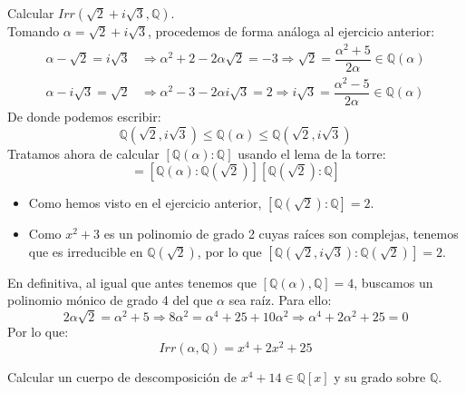 \begin{ejercicio}
    Calcular $Irr(\sqrt{2}+i\sqrt{3},\mathbb{Q})$.\\

    \noindent
    Tomando $\alpha = \sqrt{2}+i\sqrt{3}$, procedemos de forma análoga al ejercicio anterior:
    \begin{align*}
        \alpha-\sqrt{2} = i\sqrt{3} &\Longrightarrow \alpha^2 + 2 - 2\alpha\sqrt{2} = -3 \Longrightarrow \sqrt{2} = \dfrac{\alpha^2+5}{2\alpha} \in \mathbb{Q}(\alpha)\\
        \alpha-i\sqrt{3} = \sqrt{2} &\Longrightarrow \alpha^2 -3 -2\alpha i \sqrt{3} = 2 \Longrightarrow i\sqrt{3} = \dfrac{\alpha^2-5}{2\alpha} \in \mathbb{Q}(\alpha)
    \end{align*}
    De donde podemos escribir:
    \begin{equation*}
        \mathbb{Q}(\sqrt{2},i\sqrt{3}) \leq \mathbb{Q}(\alpha) \leq \mathbb{Q}(\sqrt{2},i\sqrt{3})
    \end{equation*}
    Tratamos ahora de calcular $[\mathbb{Q}(\alpha):\mathbb{Q}]$ usando el lema de la torre:
    \begin{equation*}
        [\mathbb{Q}(\alpha):\mathbb{Q}] = [\mathbb{Q}(\alpha):\mathbb{Q}(\sqrt{2})][\mathbb{Q}(\sqrt{2}):\mathbb{Q}]
    \end{equation*}
    \begin{itemize}
        \item Como hemos visto en el ejercicio anterior, $[\mathbb{Q}(\sqrt{2}):\mathbb{Q}]=2$.
        \item Como $x^2+3$ es un polinomio de grado 2 cuyas raíces son complejas, tenemos que es irreducible en $\mathbb{Q}(\sqrt{2})$, por lo que $[\mathbb{Q}(\sqrt{2},i\sqrt{3}):\mathbb{Q}(\sqrt{2})] = 2$.
    \end{itemize}
    En definitiva, al igual que antes tenemos que $[\mathbb{Q}(\alpha),\mathbb{Q}] = 4$, buscamos un polinomio mónico de grado 4 del que $\alpha$ sea raíz. Para ello:
    \begin{equation*}
        2\alpha\sqrt{2} = \alpha^2 + 5 \Longrightarrow 8\alpha^2 = \alpha^4 + 25 + 10\alpha^2 \Longrightarrow \alpha^4 + 2\alpha^2 + 25 = 0
    \end{equation*}
    Por lo que:
    \begin{equation*}
        Irr(\alpha,\mathbb{Q}) = x^4+2x^2+25
    \end{equation*}
\end{ejercicio}

\begin{ejercicio}
    Calcular un cuerpo de descomposición de $x^4+14\in \mathbb{Q}[x]$ y su grado sobre $\mathbb{Q}$.
\end{ejercicio}

